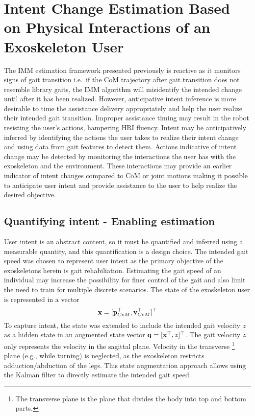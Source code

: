 \chapter{Intent Change Estimation Based on Physical Interactions of an	Exoskeleton User}\label{chapter:BKF}
The IMM estimation framework presented previously is reactive as it monitors signs of gait transition i.e.~if the CoM trajectory after gait transition does not resemble library gaits, the IMM algorithm will misidentify the intended change until after it has been realized. However, anticipative intent inference is more desirable to time the assistance delivery appropriately and help the user realize their intended gait transition. Improper assistance timing may result in the robot resisting the user's actions, hampering HRI fluency. Intent may be anticipatively inferred by identifying the actions the user takes to realize their intent change and using data from gait features to detect them. Actions indicative of intent change may be detected by monitoring the interactions the user has with the exoskeleton and the environment. These interactions may provide an earlier indicator of intent changes compared to CoM or joint motions making it possible to anticipate user intent and provide assistance to the user to help realize the desired objective. 

\section{Quantifying intent - Enabling estimation}
User intent is an abstract content, so it must be quantified and inferred using a measurable quantity, and this quantification is a design choice. The intended gait speed was chosen to represent user intent as the primary objective of the exoskeletons herein is gait rehabiliation. Estimating the gait speed of an individual may increase the possibility for finer control of the gait and also limit the need to train for multiple discrete scenarios. The state of the exoskeleton user is represented in a vector \[\mathbf{x} = [\mathbf{p}_{CoM}^{\top} ,\mathbf{v}_{CoM}^{\top}]^{\top} \] 
To capture intent, the state was extended to include the intended gait velocity $ z $ as a hidden state in an augmented state vector $ \mathbf{q} = [\mathbf{x}^{\top} ,z]^{\top} $. The gait velocity $ z $ only represents the velocity in the sagittal plane. Velocity in the transverse \footnote{The transverse plane is the plane that divides the body into top and bottom parts. } plane (e.g., while turning) is neglected, as the exoskeleton restricts adduction/abduction of the legs. This state augmentation approach allows using the Kalman filter to directly estimate the intended gait speed. 

